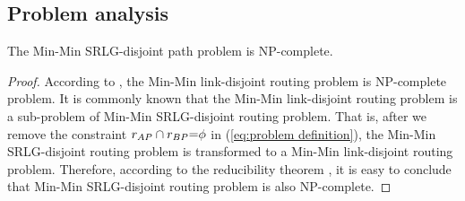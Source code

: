 \subsection{Problem analysis}
\label{sec:NPC proof}
\begin{theorem}
\label{le:lemma1}
    The Min-Min SRLG-disjoint path problem is NP-complete.
\end{theorem}

\begin{proof}
According to \cite{xu2004finding},  the Min-Min link-disjoint routing problem is NP-complete problem.
 It is commonly known that the Min-Min link-disjoint routing problem is a sub-problem of Min-Min SRLG-disjoint routing problem. That is, after we remove the constraint ${{r_{AP}} \cap {r_{BP}}{\rm{ = }}\phi }$ in (\ref{eq:problem definition}), the Min-Min SRLG-disjoint routing problem is transformed to a Min-Min link-disjoint routing problem.
 Therefore, according to  the  reducibility theorem\cite{cormen2009introduction} , it is easy to conclude that Min-Min SRLG-disjoint routing problem is also NP-complete.
\end{proof}
